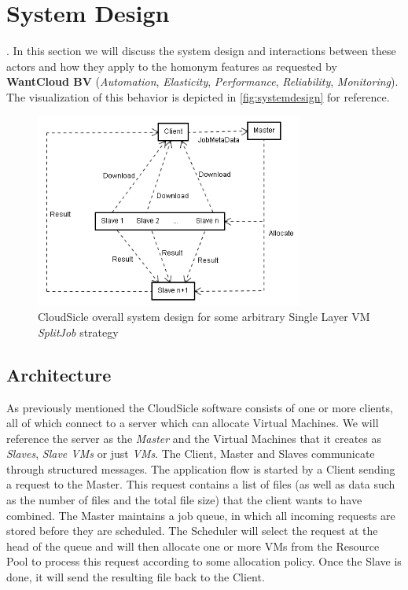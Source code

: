 \documentclass[twocolumn,twoside]{IEEEtran}
\begin{document}
\section{System Design}
\label{sec:design}
. In this section we will discuss the system 
design and interactions between these actors and how they apply
to the homonym features as requested by \textbf{WantCloud BV} 
(\textit{Automation}, \textit{Elasticity}, \textit{Performance}, \textit{Reliability}, \textit{Monitoring}). 
The visualization
of this behavior is depicted in \autoref{fig:systemdesign} for
reference. 

\begin{figure}[h]
\begin{center}
\includegraphics[width=88mm,keepaspectratio=true]{general_cloudsicle}
\caption{CloudSicle overall system design for some arbitrary Single Layer VM \textit{SplitJob} strategy}
\label{fig:systemdesign}
\end{center}
\end{figure}

\subsection{Architecture}
As previously mentioned the CloudSicle software consists of one or more clients, all of which connect to a server which can allocate Virtual Machines. We will reference the server as the \textit{Master} and the Virtual Machines that it creates as \textit{Slaves}, \textit{Slave VMs} or just \textit{VMs}. The Client, Master and Slaves communicate through structured messages. The application flow is started by a Client sending a request to the Master. This request contains a list of files (as well as data such as the number of files and the total file size) that the client wants to have combined. The Master maintains a job queue, in which all incoming requests are stored before they are scheduled. The Scheduler will select the request at the head of the queue and will then allocate one or more VMs from the Resource Pool to process this request according to some allocation policy. Once the Slave is done, it will send the resulting file back to the Client.
\end{document}
